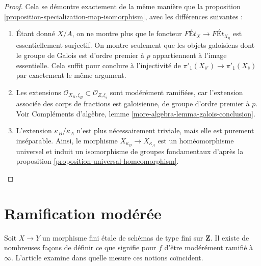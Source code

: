 \begin{proof}
Cela se démontre exactement de la même manière que la
proposition \ref{proposition-specialization-map-isomorphism},
avec les différences suivantes :
\begin{enumerate}
\item Étant donné $X/A$, on ne montre plus que le foncteur
$\textit{F\'Et}_X \to \textit{F\'Et}_{X_{\overline{\eta}}}$
est essentiellement surjectif. On montre seulement que les objets galoisiens
dont le groupe de Galois est d'ordre premier à $p$ appartiennent à l'image
essentielle. Cela suffit pour conclure à l'injectivité de
$\pi'_1(X_{\overline{s}'}) \to \pi'_1(X_{\overline{s}})$ par
exactement le même argument.
\item Les extensions
$\mathcal{O}_{X_B, \xi_B} \subset \mathcal{O}_{Z, \xi_i}$
sont modérément ramifiées, car l'extension associée des corps de
fractions est galoisienne, de groupe d'ordre premier à $p$. Voir
Compléments d'algèbre, lemme \ref{more-algebra-lemma-galois-conclusion}.
\item L'extension $\kappa_B/\kappa_A$ n'est plus
nécessairement triviale, mais elle est purement inséparable.
Ainsi, le morphisme $X_{\kappa_B} \to X_{\kappa_A}$
est un homéomorphisme universel et induit un isomorphisme
de groupes fondamentaux d'après la proposition \ref{proposition-universal-homeomorphism}.
\end{enumerate}
\end{proof}













\section{Ramification modérée}
\label{section-tame}

\noindent
Soit $X \to Y$ un morphisme fini \'etale de schémas de type fini
sur $\mathbf{Z}$. Il existe de nombreuses façons de définir ce que signifie pour $f$
d'être modérément ramifié à $\infty$. L'article \cite{Kerz-Schmidt}
examine dans quelle mesure ces notions coïncident.

